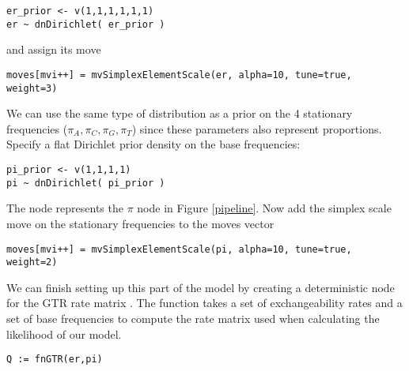 {\tt \begin{snugshade*}
\begin{lstlisting}
er_prior <- v(1,1,1,1,1,1) 
er ~ dnDirichlet( er_prior )
\end{lstlisting}
\end{snugshade*}}

and assign its move

{\tt \begin{snugshade*}
\begin{lstlisting}
moves[mvi++] = mvSimplexElementScale(er, alpha=10, tune=true, weight=3) 
\end{lstlisting}
\end{snugshade*}}

We can use the same type of distribution as a prior on the 4 stationary frequencies ($\pi_A, \pi_C, \pi_G, \pi_T$) since these parameters also represent proportions. 
Specify a flat Dirichlet prior density on the base frequencies:
{\tt \begin{snugshade*}
\begin{lstlisting}
pi_prior <- v(1,1,1,1) 
pi ~ dnDirichlet( pi_prior )
\end{lstlisting}
\end{snugshade*}}

The node  represents the $\pi$ node in Figure \ref{pipeline}.
Now add the simplex scale move on the stationary frequencies to the moves vector

{\tt \small \begin{snugshade*}
\begin{lstlisting}
moves[mvi++] = mvSimplexElementScale(pi, alpha=10, tune=true, weight=2) 
\end{lstlisting}
\end{snugshade*}}

We can finish setting up this part of the model by creating a deterministic node for the GTR rate matrix . 
The  function takes a set of exchangeability rates and a set of base frequencies to compute the rate matrix used when calculating the likelihood of our model.
{\tt \begin{snugshade*}
\begin{lstlisting}
Q := fnGTR(er,pi)
\end{lstlisting}
\end{snugshade*}}


